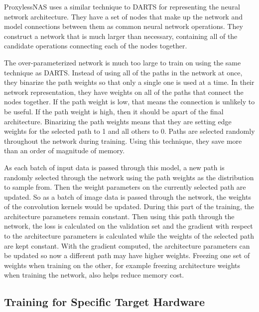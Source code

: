 \documentclass{ieee}
\begin{document}
ProxylessNAS uses a similar technique to DARTS for representing the neural network architecture. They have a set of nodes that make up the network and model connections between them as common neural network operations. They construct a network that is much larger than necessary, containing all of the candidate operations connecting each of the nodes together.

The over-parameterized network is much too large to train on using the same technique as DARTS. Instead of using all of the paths in the network at once, they binarize the path weights so that only a single one is used at a time. In their network representation, they have weights on all of the paths that connect the nodes together. If the path weight is low, that means the connection is unlikely to be useful. If the path weight is high, then it should be apart of the final architecture. Binarizing the path weights means that they are setting edge weights for the selected path to 1 and all others to 0. Paths are selected randomly throughout the network during training. Using this technique, they save more than an order of magnitude of memory.

As each batch of input data is passed through this model, a new path is randomly selected through the network using the path weights as the distribution to sample from. Then the weight parameters on the currently selected path are updated. So as a batch of image data is passed through the network, the weights of the convolution kernels would be updated. During this part of the training, the architecture parameters remain constant. Then using this path through the network, the loss is calculated on the validation set and the gradient with respect to the architecture parameters is calculated while the weights of the selected path are kept constant. With the gradient computed, the architecture parameters can be updated so now a different path may have higher weights. Freezing one set of weights when training on the other, for example freezing architecture weights when training the network, also helps reduce memory cost.

\subsection{Training for Specific Target Hardware}
\end{document}
